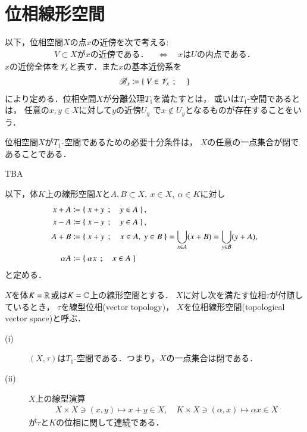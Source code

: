 \section{位相線形空間}
	以下，位相空間$X$の点$x$の近傍を次で考える:
	\begin{align}
		\mbox{$V \subset X$が$x$の近傍である．}
		\quad \Leftrightarrow \quad
		\mbox{$x$は$U$の内点である．}
	\end{align}
	$x$の近傍全体を$\mathscr{V}_{x}$と表す．また$x$の基本近傍系を
	\begin{align}
		\mathscr{B}_{x} \coloneqq
		\left\{\ V \in \mathscr{V}_{x}\ \, ; \quad \ \right\}
	\end{align}
	により定める．位相空間$X$が分離公理$T_1$を満たすとは，
	或いは$T_1$-空間であるとは，
	任意の$x,y \in X$に対して$y$の近傍$U_y$
	で$x \notin U_y$となるものが存在することをいう．
	
	\begin{screen}
		\begin{thm}[$T_1$-空間の特徴づけ]
			位相空間$X$が$T_1$-空間であるための必要十分条件は，
			$X$の任意の一点集合が閉であることである．
		\end{thm}
	\end{screen}
	
	\begin{prf}
		TBA
	\end{prf}
	
	以下，体$K$上の線形空間$X$と$A,B \subset X,\ x \in X,\ \alpha \in K$に対し
	\begin{align}
		x + A &\coloneqq \left\{\ x + y\ \, ; \quad y \in A\ \right\}, \\
		x - A &\coloneqq \left\{\ x - y\ \, ; \quad y \in A\ \right\}, \\
		A + B &\coloneqq \left\{\ x+y\ \, ; \quad x \in A,\ y \in B\ \right\} = \bigcup_{x \in A} (x + B) 
			= \bigcup_{y \in B} (y + A), \\
		\alpha A &\coloneqq \left\{\ \alpha x\ \, ; \quad x \in A\ \right\} 
	\end{align}
	と定める．
	\begin{screen}
		\begin{dfn}[位相線形空間]
			$X$を体$K = \mathbb{R}$或は$K = \mathbb{C}$上の線形空間とする．
			$X$に対し次を満たす位相$\tau$が付随しているとき，
			$\tau$を線型位相(vector topology)，
			$X$を位相線形空間(topological vector space)と呼ぶ．
			\begin{description}
				\item[(i)] $(X,\tau)$は$T_1$-空間である．つまり，$X$の一点集合は閉である．
				\item[(ii)] $X$上の線型演算
					\begin{align}
						X \times X \ni (x,y) \longmapsto x+y \in X, 
						\quad K \times X \ni (\alpha, x) \longmapsto \alpha x \in X
					\end{align}
					が$\tau$と$K$の位相に関して連続である．
			\end{description}
		\end{dfn}
	\end{screen}
	
